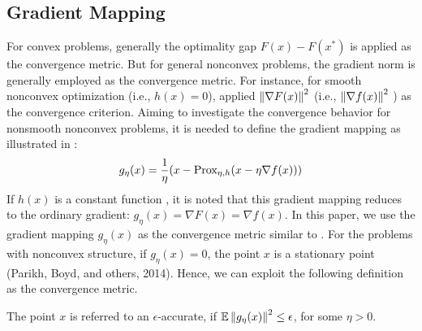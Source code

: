 \subsection{Gradient Mapping}
For convex problems, generally the optimality gap $F(x) - F(x^*)$ is applied as the convergence metric. But for general nonconvex problems, the gradient norm is generally employed as the convergence metric. For instance, for smooth nonconvex optimization (i.e., $h(x) = 0$), \cite{ghadimi2013stochastic,reddi2016stochastic,lei2017non,liu2018zeroth}  applied $\left\lVert\nabla F(x)\right\rVert^2$ (i.e., $\left\lVert\nabla f(x)\right\rVert^2$ ) as the convergence criterion. Aiming to investigate the
convergence behavior for nonsmooth nonconvex problems, it is needed to define the gradient mapping as illustrated in \cite{ghadimi2016accelerated,reddi2016proximal,huang2019faster}:
\begin{equation}
g_{\eta}(x) = \frac{1}{\eta}(x-\text{Prox}_{\eta,h}(x-\eta \nabla f(x)))
\end{equation}
If $h(x)$ is a constant function , it is noted that this gradient mapping reduces to the ordinary gradient:
$g_{\eta}(x) = \nabla F(x) = \nabla f(x)$. In this paper, we use the gradient mapping $g_{\eta}(x)$ as the convergence metric similar to
\cite{ghadimi2016accelerated,reddi2016proximal,parikh2014proximal}.
For the problems with nonconvex structure, if $g_{\eta}(x) = 0$, the point $x$ is a stationary point (Parikh, Boyd, and others, 2014). Hence, we can
exploit the following definition as the convergence metric.
\begin{definition}
The point $x$ is referred to an $\epsilon$-accurate, if $\mathbb{E}\left\lVert g_{\eta}(x)\right\rVert^2 \leq \epsilon$, for some $\eta > 0$.
\end{definition}
\fi
